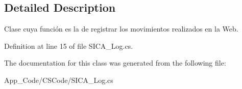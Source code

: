 \subsection{Detailed Description}
Clase cuya función es la de registrar los movimientos realizados en la Web. 



Definition at line 15 of file S\+I\+C\+A\+\_\+\+Log.\+cs.



The documentation for this class was generated from the following file\+:\begin{DoxyCompactItemize}
\item 
App\+\_\+\+Code/\+C\+S\+Code/S\+I\+C\+A\+\_\+\+Log.\+cs\end{DoxyCompactItemize}

